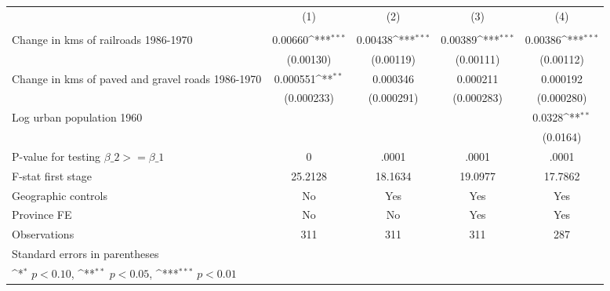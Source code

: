 {
\def\sym#1{\ifmmode^{#1}\else\(^{#1}\)\fi}
\begin{tabular}{l*{4}{c}}
\hline\hline
                &\multicolumn{1}{c}{(1)}&\multicolumn{1}{c}{(2)}&\multicolumn{1}{c}{(3)}&\multicolumn{1}{c}{(4)}\\
                &\multicolumn{1}{c}{}&\multicolumn{1}{c}{}&\multicolumn{1}{c}{}&\multicolumn{1}{c}{}\\
\hline
Change in kms of railroads 1986-1970&  0.00660\sym{***}&  0.00438\sym{***}&  0.00389\sym{***}&  0.00386\sym{***}\\
                &(0.00130)         &(0.00119)         &(0.00111)         &(0.00112)         \\
[1em]
Change in kms of paved and gravel roads 1986-1970& 0.000551\sym{**} & 0.000346         & 0.000211         & 0.000192         \\
                &(0.000233)         &(0.000291)         &(0.000283)         &(0.000280)         \\
[1em]
Log urban population 1960&                  &                  &                  &   0.0328\sym{**} \\
                &                  &                  &                  & (0.0164)         \\
\hline
P-value for testing $\beta\_{2} >= \beta\_{1}$&        0         &    .0001         &    .0001         &    .0001         \\
F-stat first stage&  25.2128         &  18.1634         &  19.0977         &  17.7862         \\
Geographic controls&       No         &      Yes         &      Yes         &      Yes         \\
Province FE     &       No         &       No         &      Yes         &      Yes         \\
Observations    &      311         &      311         &      311         &      287         \\
\hline\hline
\multicolumn{5}{l}{\footnotesize Standard errors in parentheses}\\
\multicolumn{5}{l}{\footnotesize \sym{*} \(p<0.10\), \sym{**} \(p<0.05\), \sym{***} \(p<0.01\)}\\
\end{tabular}
}
